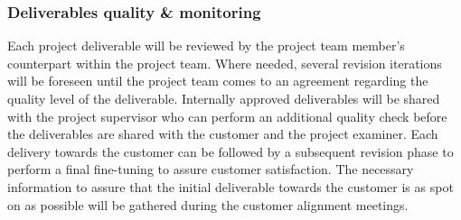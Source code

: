 \subsubsection{Deliverables quality \& monitoring}
Each project deliverable will be reviewed by the project team member’s counterpart within the project team.
Where needed, several revision iterations will be foreseen until the project team comes to an agreement regarding the quality level of the deliverable.
Internally approved deliverables will be shared with the project supervisor who can perform an additional quality check before the deliverables are shared with the customer and the project examiner.
Each delivery towards the customer can be followed by a subsequent revision phase to perform a final fine-tuning to assure customer satisfaction.
The necessary information to assure that the initial deliverable towards the customer is as spot on as possible will be gathered during the customer alignment meetings. 





